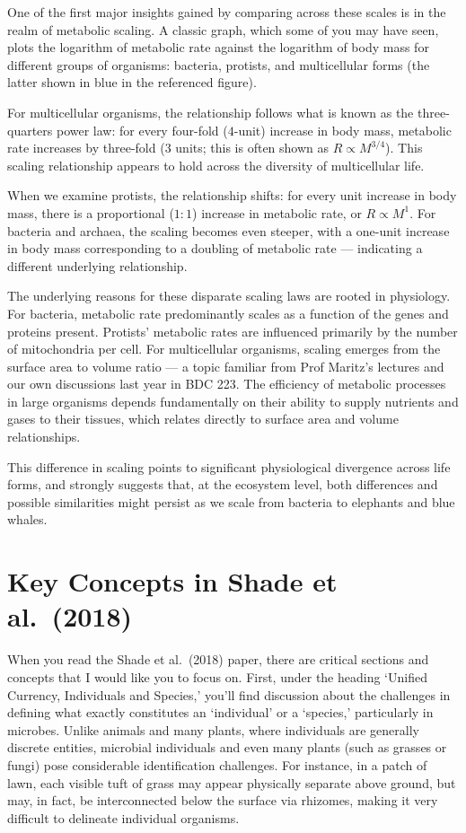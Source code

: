 \documentclass[
  12pt,
]{book}
\begin{document}
One of the first major insights gained by comparing across these scales
is in the realm of metabolic scaling. A classic graph, which some of you
may have seen, plots the logarithm of metabolic rate against the
logarithm of body mass for different groups of organisms: bacteria,
protists, and multicellular forms (the latter shown in blue in the
referenced figure).

For multicellular organisms, the relationship follows what is known as
the three-quarters power law: for every four-fold (\(4\)-unit) increase
in body mass, metabolic rate increases by three-fold (\(3\) units; this
is often shown as \(R \propto M^{3/4}\)). This scaling relationship
appears to hold across the diversity of multicellular life.

When we examine protists, the relationship shifts: for every unit
increase in body mass, there is a proportional (\(1:1\)) increase in
metabolic rate, or \(R \propto M^1\). For bacteria and archaea, the
scaling becomes even steeper, with a one-unit increase in body mass
corresponding to a doubling of metabolic rate --- indicating a different
underlying relationship.

The underlying reasons for these disparate scaling laws are rooted in
physiology. For bacteria, metabolic rate predominantly scales as a
function of the genes and proteins present. Protists' metabolic rates
are influenced primarily by the number of mitochondria per cell. For
multicellular organisms, scaling emerges from the surface area to volume
ratio --- a topic familiar from Prof Maritz's lectures and our own
discussions last year in BDC 223. The efficiency of metabolic processes
in large organisms depends fundamentally on their ability to supply
nutrients and gases to their tissues, which relates directly to surface
area and volume relationships.

This difference in scaling points to significant physiological
divergence across life forms, and strongly suggests that, at the
ecosystem level, both differences and possible similarities might
persist as we scale from bacteria to elephants and blue whales.

\section{Key Concepts in Shade et
al.~(2018)}\label{key-concepts-in-shade-et-al.-2018}

When you read the Shade et al.~(2018) paper, there are critical sections
and concepts that I would like you to focus on. First, under the heading
`Unified Currency, Individuals and Species,' you'll find discussion
about the challenges in defining what exactly constitutes an
`individual' or a `species,' particularly in microbes. Unlike animals
and many plants, where individuals are generally discrete entities,
microbial individuals and even many plants (such as grasses or fungi)
pose considerable identification challenges. For instance, in a patch of
lawn, each visible tuft of grass may appear physically separate above
ground, but may, in fact, be interconnected below the surface via
rhizomes, making it very difficult to delineate individual organisms.
\end{document}
